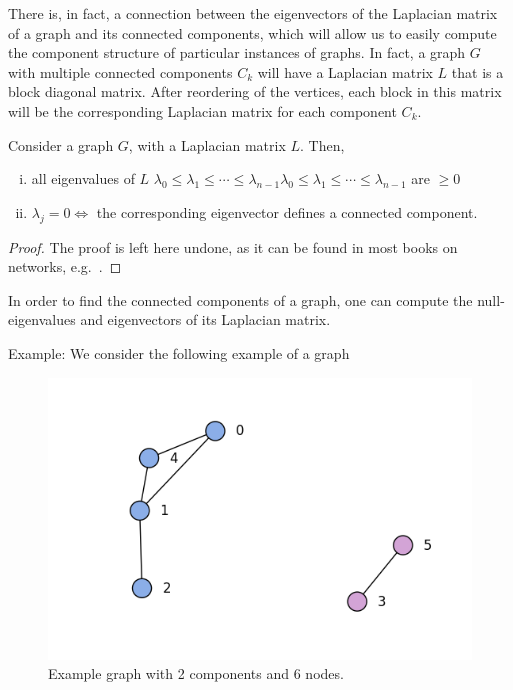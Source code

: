 There is, in fact, a connection between the eigenvectors of the Laplacian matrix of a graph and its connected components, which will allow us to easily compute the component structure of particular instances of graphs.
In fact, a graph $G$ with multiple connected components $C_k$ will have a Laplacian matrix $L$ that is a block diagonal matrix.
After reordering of the vertices, each block in this matrix will be the corresponding Laplacian matrix for each component $C_k$.
\begin{theorem}
Consider a graph $G$, with a Laplacian matrix $L$. Then,
\begin{enumerate}[(i)]
	\item all eigenvalues of $L$ ${\displaystyle \lambda _{0}\leq \lambda _{1}\leq \cdots \leq \lambda _{n-1}} \lambda_0 \le \lambda_1 \le \cdots \le \lambda_{n-1}$ are $\ge 0$
	\item $\lambda_j = 0 \iff $ the corresponding eigenvector defines a connected component.
\end{enumerate}
\end{theorem}
\begin{proof}The proof is left here undone, as it can be found in most books on networks, e.g.~\cite{newman2010networks}.\end{proof}
\begin{remark}

In order to find the connected components of a graph, one can compute the null-eigenvalues and eigenvectors of its Laplacian matrix.

\end{remark}
\begin{example}{\noindent Example: }We consider the following example of a graph
\end{example}
\begin{figure}[hb]
	\centering
	\includegraphics[scale=0.8]{figures/2_example_graph.png}
	\caption{Example graph with 2 components and 6 nodes.}
	\label{fig:example_graph}
\end{figure}
